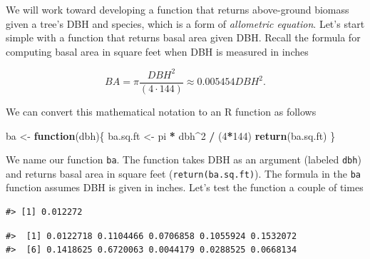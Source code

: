 \documentclass[
  11pt,
]{krantz}
\newenvironment{Shaded}{\begin{snugshade}}{\end{snugshade}}
\newcommand{\CommentTok}[1]{\textcolor[rgb]{0.56,0.35,0.01}{\textit{#1}}}
\newcommand{\ControlFlowTok}[1]{\textcolor[rgb]{0.13,0.29,0.53}{\textbf{#1}}}
\newcommand{\DecValTok}[1]{\textcolor[rgb]{0.00,0.00,0.81}{#1}}
\newcommand{\KeywordTok}[1]{\textcolor[rgb]{0.13,0.29,0.53}{\textbf{#1}}}
\newcommand{\NormalTok}[1]{#1}
\newcommand{\OperatorTok}[1]{\textcolor[rgb]{0.81,0.36,0.00}{\textbf{#1}}}
\newcommand{\StringTok}[1]{\textcolor[rgb]{0.31,0.60,0.02}{#1}}
\theoremstyle{definition}
\theoremstyle{definition}
\theoremstyle{definition}
\theoremstyle{definition}
\theoremstyle{remark}
\begin{document}
We will work toward developing a function that returns above-ground biomass given a tree's DBH and species, which is a form of \emph{allometric equation}. Let's start simple with a function that returns basal area given DBH. Recall the formula for computing basal area in square feet when DBH is measured in inches

\[
BA = \pi \frac{DBH^2}{(4 \cdot 144)} \approx 0.005454DBH^2.
\]

We can convert this mathematical notation to an R function as follows

\begin{Shaded}
\begin{Highlighting}[]
\NormalTok{ba \textless{}{-}}\StringTok{ }\ControlFlowTok{function}\NormalTok{(dbh)\{}
\NormalTok{  ba.sq.ft \textless{}{-}}\StringTok{ }\NormalTok{pi }\OperatorTok{*}\StringTok{ }\NormalTok{dbh}\OperatorTok{\^{}}\DecValTok{2} \OperatorTok{/}\StringTok{ }\NormalTok{(}\DecValTok{4}\OperatorTok{*}\DecValTok{144}\NormalTok{)}
  \KeywordTok{return}\NormalTok{(ba.sq.ft)}
\NormalTok{\}}
\end{Highlighting}
\end{Shaded}

We name our function \texttt{ba}. The function takes DBH as an argument (labeled \texttt{dbh}) and returns basal area in square feet (\texttt{return(ba.sq.ft)}). The formula in the \texttt{ba} function assumes DBH is given in inches. Let's test the function a couple of times

\begin{Shaded}
\end{Shaded}

\begin{verbatim}
#> [1] 0.012272
\end{verbatim}

\begin{Shaded}
\end{Shaded}

\begin{verbatim}
#>  [1] 0.0122718 0.1104466 0.0706858 0.1055924 0.1532072
#>  [6] 0.1418625 0.6720063 0.0044179 0.0288525 0.0668134
\end{verbatim}
\end{document}
